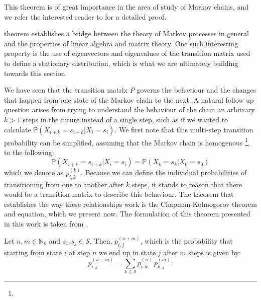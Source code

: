 This theorem is of great importance in the area of study of Markov chains, and we refer the interested reader to \cite[\S 1.2]{chung_markov_1960} for a detailed proof.

 theorem establishes a bridge between the theory of Markov processes in general and the properties of linear algebra and matrix theory. One such interesting property is the use of eigenvectors and eigenvalues of the transition matrix used to define a stationary distribution, which is what we are ultimately building towards this section. 

We have seen that the transition matrix $P$ governs the behaviour and the changes that happen from one state of the Markov chain to the next. 
A natural follow up question arises from trying to understand the behaviour of the chain an arbitrary $k > 1$ steps in the future instead of a single step, such as if we wanted to calculate $\mathbb{P}(X_{i+k} = s_{i+k} | X_i = s_i)$. 
We first note that this multi-step transition probability can be simplified, assuming that the Markov chain is homogenous \footnote{}, to the following: 
\[ \mathbb{P}(X_{i+k} = s_{i+k} | X_i = s_i) = \mathbb{P}(X_{k} = s_{k} | X_0 = s_0) \]
which we denote as $p_{i,k}^{(k)}$. Because we can define the individual probabilities of transitioning from one  to another after $k$ steps, it stands to reason that there would be a transition matrix to describe this behaviour.
The theorem that establishes the way these relationships work is the Chapman-Kolmogorov theorem and equation, which we present now. The formulation of this theorem presented in this work is taken from \cite[\S 8.3]{Zitkovic_2010}. 

\begin{theorem}
	Let $n,m \in \mathbb{N}_0$ and $s_i, s_j \in \mathcal{S}$. Then, $p_{i,j}^{(n+m)}$, which is the probability that starting from state $i$ at step $n$ we end up in state $j$ after $m$ steps is given by: 
	\[ p_{i,j}^{(n+m)}  = \sum_{k \in \mathcal{S}} p_{i,k}^{(n)} \, p_{k,j}^{(m)}. \]
\end{theorem} 

